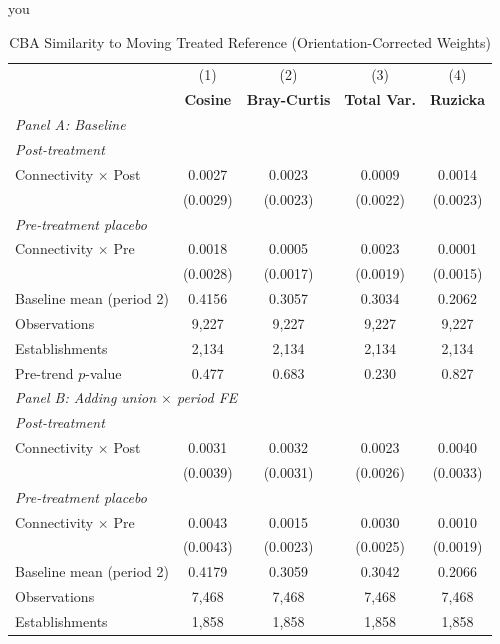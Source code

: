 you \begin{table}[H]
\centering
\caption{CBA Similarity to Moving Treated Reference (Orientation-Corrected Weights)}
\label{tab:corr_w_cba_similarity}
\scriptsize
\setlength{\tabcolsep}{8pt}
\begin{tabular}{lcccc}
\hline\hline
 & (1) & (2) & (3) & (4) \\
 & \textbf{Cosine} & \textbf{Bray-Curtis} & \textbf{Total Var.} & \textbf{Ruzicka} \\
\hline
\multicolumn{5}{l}{\textit{Panel A: Baseline}} \\
\multicolumn{5}{l}{\textit{Post-treatment}} \\
Connectivity $\times$ Post & 0.0027 & 0.0023 & 0.0009 & 0.0014 \\
 & (0.0029) & (0.0023) & (0.0022) & (0.0023) \\
\multicolumn{5}{l}{\textit{Pre-treatment placebo}} \\
Connectivity $\times$ Pre & 0.0018 & 0.0005 & 0.0023 & 0.0001 \\
 & (0.0028) & (0.0017) & (0.0019) & (0.0015) \\
\hline
Baseline mean (period 2) & 0.4156 & 0.3057 & 0.3034 & 0.2062 \\
Observations &        9,227 &        9,227 &        9,227 &        9,227 \\
Establishments &        2,134 &        2,134 &        2,134 &        2,134 \\
Pre-trend $p$-value & 0.477 & 0.683 & 0.230 & 0.827 \\
\hline
\multicolumn{5}{l}{\textit{Panel B: Adding union $\times$ period FE}} \\
\multicolumn{5}{l}{\textit{Post-treatment}} \\
Connectivity $\times$ Post & 0.0031 & 0.0032 & 0.0023 & 0.0040 \\
 & (0.0039) & (0.0031) & (0.0026) & (0.0033) \\
\multicolumn{5}{l}{\textit{Pre-treatment placebo}} \\
Connectivity $\times$ Pre & 0.0043 & 0.0015 & 0.0030 & 0.0010 \\
 & (0.0043) & (0.0023) & (0.0025) & (0.0019) \\
\hline
Baseline mean (period 2) & 0.4179 & 0.3059 & 0.3042 & 0.2066 \\
Observations &        7,468 &        7,468 &        7,468 &        7,468 \\
Establishments &        1,858 &        1,858 &        1,858 &        1,858 \\

\end{tabular}
\end{table}
